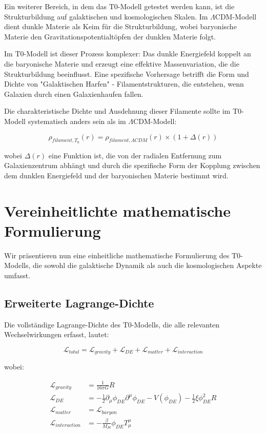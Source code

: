 \documentclass[a4paper,12pt]{article}
\begin{document}
	Ein weiterer Bereich, in dem das T0-Modell getestet werden kann, ist die Strukturbildung auf galaktischen und kosmologischen Skalen. Im $\Lambda$CDM-Modell dient dunkle Materie als Keim für die Strukturbildung, wobei baryonische Materie den Gravitationspotentialtöpfen der dunklen Materie folgt.
	
	Im T0-Modell ist dieser Prozess komplexer: Das dunkle Energiefeld koppelt an die baryonische Materie und erzeugt eine effektive Massenvariation, die die Strukturbildung beeinflusst. Eine spezifische Vorhersage betrifft die Form und Dichte von "Galaktischen Harfen" - Filamentstrukturen, die entstehen, wenn Galaxien durch einen Galaxienhaufen fallen.
	
	Die charakteristische Dichte und Ausdehnung dieser Filamente sollte im T0-Modell systematisch anders sein als im $\Lambda$CDM-Modell:
	
	\begin{equation}
		\rho_{filament,T_0}(r) = \rho_{filament,\Lambda CDM}(r) \times \left(1 + \Delta(r)\right)
	\end{equation}
	
	wobei $\Delta(r)$ eine Funktion ist, die von der radialen Entfernung zum Galaxienzentrum abhängt und durch die spezifische Form der Kopplung zwischen dem dunklen Energiefeld und der baryonischen Materie bestimmt wird.
	
	\section{Vereinheitlichte mathematische Formulierung}
	
	Wir präsentieren nun eine einheitliche mathematische Formulierung des T0-Modells, die sowohl die galaktische Dynamik als auch die kosmologischen Aspekte umfasst.
	
	\subsection{Erweiterte Lagrange-Dichte}
	
	Die vollständige Lagrange-Dichte des T0-Modells, die alle relevanten Wechselwirkungen erfasst, lautet:
	
	\begin{equation}
		\mathcal{L}_{total} = \mathcal{L}_{gravity} + \mathcal{L}_{DE} + \mathcal{L}_{matter} + \mathcal{L}_{interaction}
	\end{equation}
	
	wobei:
	
	\begin{align}
		\mathcal{L}_{gravity} &= \frac{1}{16\pi G}R\\
		\mathcal{L}_{DE} &= -\frac{1}{2}\partial_\mu \phi_{DE} \partial^\mu \phi_{DE} - V(\phi_{DE}) - \frac{1}{2}\xi \phi_{DE}^2 R\\
		\mathcal{L}_{matter} &= \mathcal{L}_{baryon}\\
		\mathcal{L}_{interaction} &= -\frac{\beta}{M_{Pl}}\phi_{DE}T^{\mu}_{\mu}
	\end{align}
	
\end{document}

